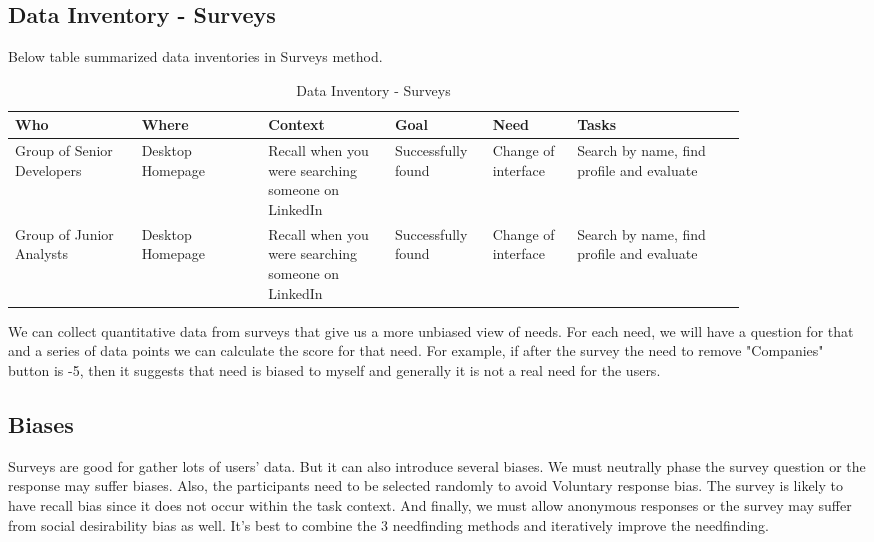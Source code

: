 \documentclass[
	letterpaper, %
]{jdf}
\begin{document}
\subsection{Data Inventory - Surveys}
Below table summarized data inventories in Surveys method.
\begin{table}[h] %
	\caption{Data Inventory - Surveys}
	\small %
	\centering %
	\begin{tabular}{L{0.15\linewidth} L{0.15\linewidth} L{0.15\linewidth} L{0.1\linewidth} L{0.1\linewidth} L{0.2\linewidth}}
		\textbf{Who} & \textbf{Where} & \textbf{Context} & \textbf{Goal} & \textbf{Need} & \textbf{Tasks}\\
		\toprule[0.5pt]
		Group of Senior Developers & Desktop Homepage & Recall when you were searching someone on LinkedIn & Successfully found & Change of interface & Search by name, find profile and evaluate\\
		\midrule
		Group of Junior Analysts & Desktop Homepage & Recall when you were searching someone on LinkedIn & Successfully found & Change of interface & Search by name, find profile and evaluate \\
	\end{tabular}
\end{table}

We can collect quantitative data from surveys that give us a more unbiased view of needs. For each need, we will have a question for that and a series of data points we can calculate the score for that need. For example, if after the survey the need to remove "Companies" button is -5, then
it suggests that need is biased to myself and generally it is not a real need for the users.

\subsection{Biases}
Surveys are good for gather lots of users' data. But it can also introduce several biases. We must neutrally phase the survey question or the response may suffer biases. Also, the participants need to be selected randomly to avoid Voluntary response bias. The survey is likely to have recall bias since it does not occur within the task context. And finally, we must allow anonymous responses or the survey may suffer from social desirability bias as well. It's best to combine the 3 needfinding methods and iteratively improve the needfinding.
\end{document}
